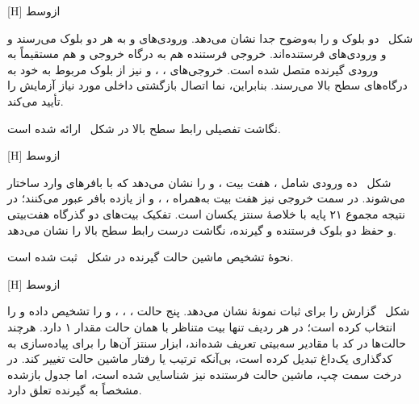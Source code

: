 [H]
‌ازوسط

شکل~ دو بلوک  و  را
به‌وضوح جدا نشان می‌دهد. ورودی‌های  و  به هر دو بلوک می‌رسند و
 و  ورودی‌های فرستنده‌اند. خروجی  فرستنده
هم به درگاه خروجی  و هم مستقیماً به ورودی  گیرنده متصل شده است.
خروجی‌های ، ،  و
 نیز از بلوک مربوط به خود به درگاه‌های سطح بالا می‌رسند. بنابراین، نما
اتصال بازگشتی داخلی مورد نیاز آزمایش را تأیید می‌کند.

نگاشت تفصیلی رابط سطح بالا در شکل~ ارائه شده است.

[H]
‌ازوسط

شکل~ ده ورودی شامل ، هفت بیت
،  و  را نشان می‌دهد که با بافرهای
 وارد ساختار می‌شوند. در سمت خروجی نیز هفت بیت  به‌همراه
، ،  و  از یازده بافر
 عبور می‌کنند؛ در نتیجه مجموع ۲۱ پایه با خلاصهٔ سنتز یکسان است. تفکیک
بیت‌های دو گذرگاه هفت‌بیتی و حفظ دو بلوک فرستنده و گیرنده، نگاشت درست رابط سطح بالا را
نشان می‌دهد.

نحوهٔ تشخیص ماشین حالت گیرنده در شکل~ ثبت شده است.

[H]
‌ازوسط

شکل~ گزارش  را برای ثبات
 نمونهٔ  نشان می‌دهد.  پنج حالت
، ، ،  و  را تشخیص داده و
 را  انتخاب کرده است؛ در هر ردیف تنها بیت متناظر با همان
حالت مقدار ۱ دارد. هرچند حالت‌ها در کد  با مقادیر سه‌بیتی تعریف شده‌اند، ابزار
سنتز آن‌ها را برای پیاده‌سازی به کدگذاری یک‌داغ تبدیل کرده است، بی‌آنکه ترتیب یا رفتار ماشین
حالت تغییر کند. در درخت سمت چپ، ماشین حالت فرستنده نیز شناسایی شده است، اما جدول بازشده
مشخصاً به گیرنده تعلق دارد.


